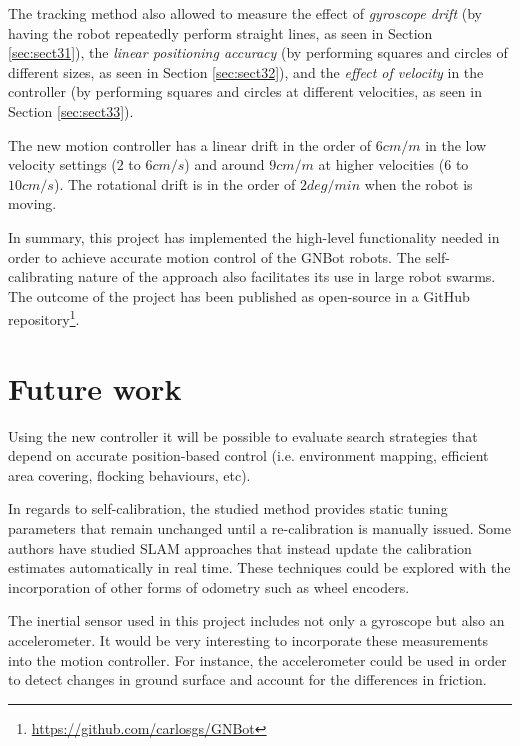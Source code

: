 \documentclass[12pt,twoside]{report}
\begin{document}
The tracking method also allowed to measure the effect of \emph{gyroscope drift} (by having the robot repeatedly perform straight lines, as seen in Section \ref{sec:sect31}), the \emph{linear positioning accuracy} (by performing squares and circles of different sizes, as seen in Section \ref{sec:sect32}), and the \emph{effect of velocity} in the controller (by performing squares and circles at different velocities, as seen in Section \ref{sec:sect33}).

The new motion controller has a linear drift in the order of $6cm/m$ in the low velocity settings ($2$ to $6cm/s$) and around $9cm/m$ at higher velocities ($6$ to $10cm/s$). The rotational drift is in the order of $2deg/min$ when the robot is moving.

In summary, this project has implemented the high-level functionality needed in order to achieve accurate motion control of the GNBot robots. The self-calibrating nature of the approach also facilitates its use in large robot swarms.
The outcome of the project has been published as open-source in a GitHub repository\footnote{\url{https://github.com/carlosgs/GNBot}}.



\section{Future work}

Using the new controller it will be possible to evaluate search strategies that depend on accurate position-based control (i.e. environment mapping, efficient area covering, flocking behaviours, etc).

In regards to self-calibration, the studied method provides static tuning parameters that remain unchanged until a re-calibration is manually issued.
Some authors have studied SLAM approaches that instead update the calibration estimates automatically in real time\cite{martinelli07,DeCecco02,roy99}.
These techniques could be explored with the incorporation of other forms of odometry such as wheel encoders.

The inertial sensor used in this project includes not only a gyroscope but also an accelerometer. It would be very interesting to incorporate these measurements into the motion controller. For instance, the accelerometer could be used in order to detect changes in ground surface and account for the differences in friction.



\clearpage{\pagestyle{empty}\cleardoublepage}

\renewcommand{\bibname}{References}
\newpage
\addcontentsline{toc}{chapter}{\bibname}


\end{document}
